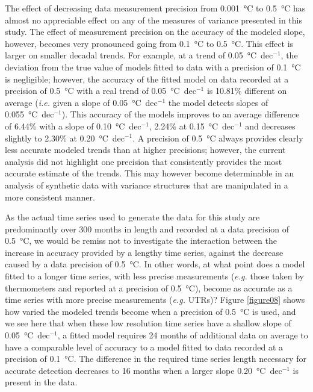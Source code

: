 \documentclass[]{ametsoc}
\begin{document}
The effect of decreasing data measurement precision from \SI{0.001}{\degreeCelsius} to \SI{0.5}{\degreeCelsius} has almost no appreciable effect on any of the measures of variance presented in this study. The effect of measurement precision on the accuracy of the modeled slope, however, becomes very pronounced going from \SI{0.1}{\degreeCelsius} to \SI{0.5}{\degreeCelsius}. This effect is larger on smaller decadal trends. For example, at a trend of \SI{0.05}{\degreeCelsius}~dec$^{-1}$, the deviation from the true value of models fitted to data with a precision of \SI{0.1}{\degreeCelsius} is negligible; however, the accuracy of the fitted model on data recorded at a precision of \SI{0.5}{\degreeCelsius} with a real trend of \SI{0.05}{\degreeCelsius}~dec$^{-1}$ is 10.81\% different on average (\emph{i.e.} given a slope of \SI{0.05}{\degreeCelsius}~dec$^{-1}$ the model detects slopes of \SI{0.055}{\degreeCelsius}~dec$^{-1}$). This accuracy of the models improves to an average difference of 6.44\% with a slope of \SI{0.10}{\degreeCelsius}~dec$^{-1}$, 2.24\% at \SI{0.15}{\degreeCelsius}~dec$^{-1}$ and decreases slightly to 2.30\% at \SI{0.20}{\degreeCelsius}~dec$^{-1}$. A precision of \SI{0.5}{\degreeCelsius} always provides clearly less accurate modeled trends than at higher precisions; however, the current analysis did not highlight one precision that consistently provides the most accurate estimate of the trends. This may however become determinable in an analysis of synthetic data with variance structures that are manipulated in a more consistent manner.

As the actual time series used to generate the data for this study are predominantly over 300 months in length and recorded at a data precision of \SI{0.5}{\degreeCelsius}, we would be remiss not to investigate the interaction between the increase in accuracy provided by a lengthy time series, against the decrease caused by a data precision of \SI{0.5}{\degreeCelsius}. In other words, at what point does a model fitted to a longer time series, with less precise measurements (\emph{e.g.} those taken by thermometers and reported at a precision of \SI{0.5}{\degreeCelsius}), become as accurate as a time series with more precise measurements (\emph{e.g.} UTRs)? Figure \ref{figure08} shows how varied the modeled trends become when a precision of \SI{0.5}{\degreeCelsius} is used, and we see here that when these low resolution time series have a shallow slope of \SI{0.05}{\degreeCelsius}~dec$^{-1}$, a fitted model requires 24 months of additional data on average to have a comparable level of accuracy to a model fitted to data recorded at a precision of \SI{0.1}{\degreeCelsius}. The difference in the required time series length necessary for accurate detection decreases to 16 months when a larger slope \SI{0.20}{\degreeCelsius}~dec$^{-1}$ is present in the data.
\end{document}
